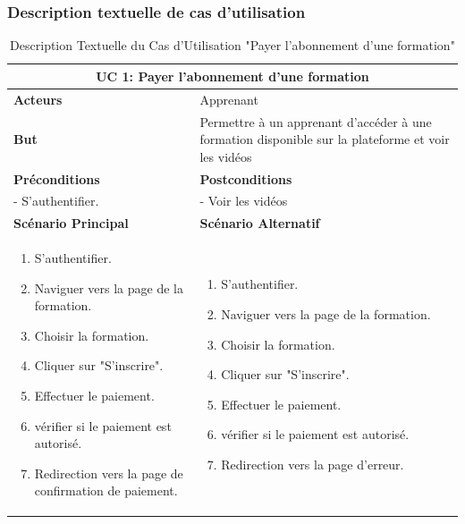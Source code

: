 \subsubsection{Description textuelle de cas d’utilisation}

\begin{minipage}{\textwidth}
\begin{table}[H]
\centering
\begin{tabular}{| m{8cm} | m{8cm} |}
\hline
\multicolumn{2}{|c|}{\textbf{UC 1:} Payer l'abonnement d'une formation} \\ \hline
\textbf{Acteurs} & Apprenant \\ \hline
\textbf{But} & Permettre à un apprenant d'accéder à une formation disponible sur la plateforme et voir les vidéos \\ \hline
\textbf{Préconditions} & \textbf{Postconditions} \\ \hline
- S'authentifier. & - Voir les vidéos \\ \hline
\textbf{Scénario Principal} & \textbf{Scénario Alternatif} \\ \hline
\begin{enumerate}
    \item S'authentifier.
    \item Naviguer vers la page de la formation.
    \item Choisir la formation.
    \item Cliquer sur "S'inscrire".
    \item Effectuer le paiement.
    \item vérifier si le paiement est autorisé.
    \item Redirection vers la page de confirmation de paiement.
\end{enumerate} & 
\begin{enumerate}
    \item S'authentifier.
    \item Naviguer vers la page de la formation.
    \item Choisir la formation.
    \item Cliquer sur "S'inscrire".
    \item Effectuer le paiement.
    \item vérifier si le paiement est autorisé.
    \item Redirection vers la page d’erreur.
\end{enumerate} \\ \hline
\end{tabular}
\caption{Description Textuelle du Cas d'Utilisation "Payer l'abonnement d'une formation"}
\label{tab:use_case_description_1}
\end{table}
\end{minipage}

